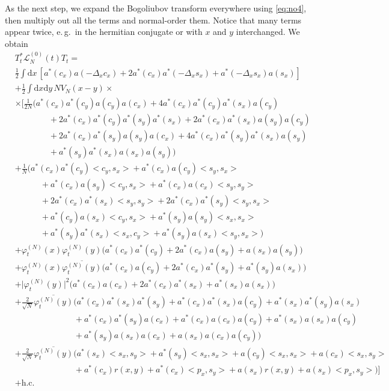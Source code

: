 \documentclass[11pt,a4paper,DIV11]{scrartcl}	%
\newcommand{\di}{\textrm{d}}		%
\newcommand{\Lcal}{\mathcal{L}}		%
\newcommand{\hc}{\mbox{h.c.}}		%
\newcommand{\scal}[2]{\big<#1,#2\big>} %
\newcommand{\cc}[1]{\overline{#1}}	%
\newcommand{\ph}{\varphi_t^{(N)}}	%
\newcommand{\tagg}[1]{ \stepcounter{equation} \tag{\theequation} \label{eq:#1} } %
\newcommand{\eqr}[1]{\eqref{eq:#1}}			%
\begin{document}
As the next step, we expand the Bogoliubov transform everywhere using
\eqr{no4}, then multiply out all the terms and normal-order them. Notice that many terms appear twice, e.\,g.\ in the hermitian conjugate or with $x$ and $y$ interchanged. We obtain
\begin{align*}
& T^*_t \Lcal_N^{(0)}(t) T_t = \\ 
& \frac{1}{2} \int \di x\, \left[ a^*(c_x) a(-\Delta_x c_x) + \boxed{2 a^*(c_x) a^*(-\Delta_x s_x)} + a^*(-\Delta_x s_x) a(s_x) \right]\\%
& + \frac{1}{2}\int \di x \di y\, NV_N(x-y) \times \\
& \times \Big[   \frac{1}{2N}\bigg( a^*(c_x) a^*(c_y) a(c_y) a(c_x) + 4 a^*(c_x) a^*(c_y) a^*(s_x) a(c_y) \\
				      & \qquad\qquad + 2 a^*(c_x) a^*(c_y) a^*(s_y) a^*(s_x) + 2 a^*(c_x) a^*(s_x) a(s_y) a(c_y) \\
				      & \qquad\qquad + 2 a^*(c_x) a^*(s_y) a(s_y) a(c_x) + 4 a^*(c_x) a^*(s_y) a^*(s_x) a(s_y) \\
				      & \qquad\qquad + a^*(s_y) a^*(s_x) a(s_x) a(s_y) \bigg) \\
& + \frac{1}{N}\bigg(   \boxed{a^*(c_x)a^*(c_y) \scal{c_y}{s_x}} + a^*(c_x) a(c_y) \scal{s_y}{s_x}\\%
			& \qquad\quad + a^*(c_x) a(s_y) \scal{c_y}{s_x} + a^*(c_x) a(c_x) \scal{s_y}{s_y} \\
			& \qquad\quad + 2 a^*(c_x) a^*(s_x) \scal{s_y}{s_y} + 2a^*(c_x)a^*(s_y) \scal{s_y}{s_x} \\
			& \qquad\quad + a^*(c_y) a(s_x) \scal{c_y}{s_x} +  a^*(s_y) a(s_y) \scal{s_x}{s_x}\\
			& \qquad\quad + a^*(s_y) a^*(s_x) \scal{s_x}{c_y} + a^*(s_y) a(s_x) \scal{s_y}{s_x}   \bigg) \\
& + \ph(x)\ph(y) \Big( \boxed{a^*(c_x) a^*(c_y)} + 2 a^*(c_x) a(s_y) +a(s_x) a(s_y) \Big)\\%
& + \ph(x) \cc{\ph(y)} \Big( a^*(c_x) a(c_y) + 2 a^*(c_x) a^*(s_y) + a^*(s_y) a(s_x) \Big) \\
& + \lvert \ph(y) \rvert^2 \Big( a^*(c_x) a(c_x) + 2 a^*(c_x) a^*(s_x) + a^*(s_x) a(s_x) \Big) \\
& + \frac{2}{\sqrt{N}}\cc{\ph(y)} \bigg(    a^*(c_x) a^*(s_x) a^*(s_y) + a^*(c_x) a^*(s_x) a(c_y) + a^*(s_x) a^*(s_y) a(s_x)\\
					    & \qquad\qquad\qquad\quad + a^*(c_x) a^*(s_y) a(c_x) + a^*(c_x) a(c_x) a(c_y)+ a^*(s_x) a(s_x) a(c_y) \\
					    & \qquad\qquad\qquad\quad + a^*(s_y) a(s_x) a(c_x) + a(s_x) a(c_x) a(c_y)    \bigg) \\
& + \frac{2}{\sqrt{N}}\cc{\ph(y)} \bigg(    a^*(s_x) \scal{s_x}{s_y} + a^*(s_y) \scal{s_x}{s_x}  + a(c_y) \scal{s_x}{s_x} + a(c_x) \scal{s_x}{s_y} \\
					    & \qquad\qquad\qquad\quad + a^*(c_x)r(x,y) + a^*(c_x)\scal{p_x}{s_y} + a(s_x)r(x,y) + a(s_x)\scal{p_x}{s_y}		\bigg)    \Big]\\
& + \hc
\end{align*}
\end{document}
